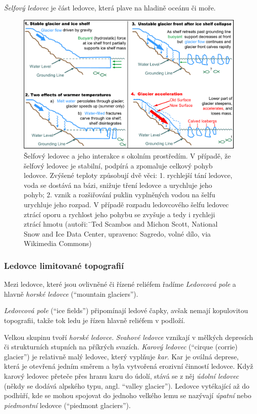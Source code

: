 \emph{Šelfový ledovec} je část ledovce, která plave na hladině oceánu či moře. 
\begin{figure}[h]
	\centering
	\includegraphics[width=1\linewidth]{obrazky/glac/iceshelf}
	\caption{Šelfový ledovec a jeho interakce s okolním prostředím. V případě, že šelfový ledovec je stabilní, podpírá a zpomaluje celkový pohyb ledovce. Zvýšené teploty způsobují dvě věci: 1. rychlejší tání ledovce, voda se dostává na bázi, snižuje tření ledovce a urychluje jeho pohyb; 2. vznik a rozšiřování puklin vyplněných vodou na šelfu urychluje jeho rozpad. V případě rozpadu ledovcového šelfu ledovec ztrácí oporu a rychlost jeho pohybu se zvyšuje a tedy i rychleji ztrácí hmotu (autoři:¨Ted Scambos and Michon Scott, National Snow and Ice Data Center, upraveno: Sagredo, volné dílo, via Wikimedia Commons)}
	\label{fig:iceshelf}
\end{figure}

\subsubsection{Ledovce limitované topografií}
Mezi ledovce, které jsou ovlivněné či řízené reliéfem řadíme \emph{Ledovcová pole} a hlavně \emph{horské ledovce} (\enquote{mountain glaciers}).

\emph{Ledovcová pole} (\enquote{ice fields}) připomínají ledové čapky, avšak nemají kopulovitou topografii, takže tok ledu je řízen hlavně reliéfem v podloží.

Velkou skupinu tvoří \emph{horské ledovce}. \emph{Svahové ledovce} vznikají v mělkých depresích či strukturních stupních na příkrých svazích. \emph{Karový ledovec} (\enquote{cirque (corrie) glacier}) je relativně malý ledovec, který vyplňuje \emph{kar}. Kar je oválná deprese, která je otevřená jedním směrem a byla vytvořená erozivní činností ledovce. Když karový ledovec přeteče přes hranu karu do údolí, stává se z něj \emph{údolní ledovec} (někdy se dodává alpského typu, angl. \enquote{valley glacier}). Ledovce vytékající až do podhůří, kde se mohou spojovat do jednoho velkého lemu se nazývají \emph{úpatní} nebo \emph{piedmontní} ledovce (\enquote{piedmont glaciers}).

